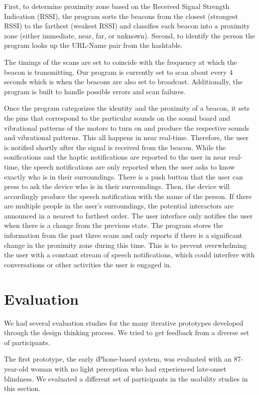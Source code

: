First, to determine proximity zone based on the Received Signal Strength Indication (RSSI), the program sorts the beacons from the closest (strongest RSSI) to the farthest (weakest RSSI) and classifies each beacon into a proximity zone (either immediate, near, far, or unknown). Second, to identify the person the program looks up the URL-Name pair from the hashtable.  

The timings of the scans are set to coincide with the frequency at which the beacon is transmitting. Our program is currently set to scan about every 4 seconds which is when the beacons are also set to broadcast. Additionally, the program is built to handle possible errors and scan failures.

Once the program categorizes the identity and the proximity of a beacon, it sets the pins that correspond to the particular sounds on the sound board and vibrational patterns of the motors to turn on and produce the respective sounds and vibrational patterns. This all happens in near real-time. Therefore, the user is notified shortly after the signal is received from the beacon. While the sonifications and the haptic notifications are reported to the user in near real-time, the speech notifications are only reported when the user asks to know exactly who is in their surroundings. There is a push button that the user can press to ask the device who is in their surroundings. Then, the device will accordingly produce the speech notification with the name of the person. If there are multiple people in the user's surroundings, the potential interactors are announced in a nearest to farthest order. The user interface only notifies the user when there is a change from the previous state. The program stores the information from the past three scans and only reports if there is a significant change in the proximity zone during this time. This is to prevent overwhelming the user with a constant stream of speech notifications, which could interfere with conversations or other activities the user is engaged in. 



\section{Evaluation}
\label{sect:evaluation}
We had several evaluation studies for the many iterative prototypes developed through the design thinking process. We tried to get feedback from a diverse set of participants.

The first prototype, the early iPhone-based system, was evaluated with an 87-year-old woman with no light perception who had experienced late-onset blindness. We evaluated a different set of participants in the usability studies in this section. 


